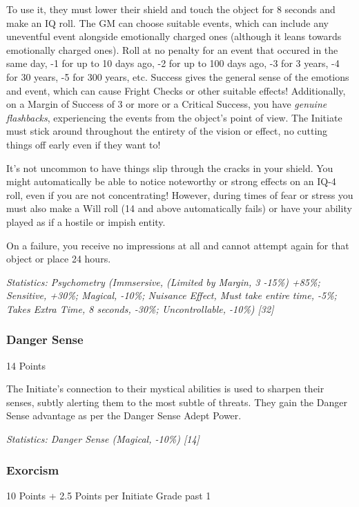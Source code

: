 \begin{multicols*}{3}
	To use it, they must lower their shield and touch the object for 8 seconds and make an IQ roll. The GM can choose suitable events, which can include any uneventful event alongside emotionally charged ones (although it leans towards emotionally charged ones). Roll at no penalty for an event that occured in the same day, -1 for up to 10 days ago, -2 for up to 100 days ago, -3 for 3 years, -4 for 30 years, -5 for 300 years, etc. Success gives the general sense of the emotions and event, which can cause Fright Checks or other suitable effects! Additionally, on a Margin of Success of 3 or more or a Critical Success, you have \textit{genuine flashbacks}, experiencing the events from the object's point of view. The Initiate must stick around throughout the entirety of the vision or effect, no cutting things off early even if they want to!
	
	It's not uncommon to have things slip through the cracks in your shield. You might automatically be able to notice noteworthy or strong effects on an IQ-4 roll, even if you are not concentrating! However, during times of fear or stress you must also make a Will roll (14 and above automatically fails) or have your ability played as if a hostile or impish entity.
	
	On a failure, you receive no impressions at all and cannot attempt again for that object or place 24 hours.
	
	\textcolor{OliveGreen}{\textit{Statistics: Psychometry (Immsersive, (Limited by Margin, 3 -15\%) +85\%; Sensitive, +30\%; Magical, -10\%; Nuisance Effect, Must take entire time, -5\%; Takes Extra Time, 8 seconds, -30\%; Uncontrollable, -10\%) [32] }}
	
	\subsubsection{Danger Sense}
	\begin{flushright}
		14 Points
	\end{flushright}
	
	The Initiate's connection to their mystical abilities is used to sharpen their senses, subtly alerting them to the most subtle of threats. They gain the Danger Sense advantage as per the Danger Sense Adept Power.
	
	\textcolor{OliveGreen}{\textit{Statistics: Danger Sense (Magical, -10\%) [14] }}
	
	\subsubsection{Exorcism}
	\begin{flushright}
		10 Points + 2.5 Points per Initiate Grade past 1
	\end{flushright}


\end{multicols*}
